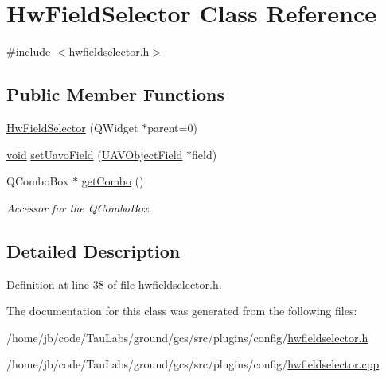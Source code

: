 \hypertarget{class_hw_field_selector}{\section{\-Hw\-Field\-Selector \-Class \-Reference}
\label{class_hw_field_selector}
}


{\ttfamily \#include $<$hwfieldselector.\-h$>$}

\subsection*{\-Public \-Member \-Functions}
\begin{DoxyCompactItemize}
\item 
\hyperlink{group___core_plugin_gaa29673aaa8535fe3be4f2a2d04bc5422}{\-Hw\-Field\-Selector} (\-Q\-Widget $\ast$parent=0)
\item 
\hyperlink{group___u_a_v_objects_plugin_ga444cf2ff3f0ecbe028adce838d373f5c}{void} \hyperlink{group___core_plugin_ga068f0e383aeba7a77ae5e4acfa3247b6}{set\-Uavo\-Field} (\hyperlink{class_u_a_v_object_field}{\-U\-A\-V\-Object\-Field} $\ast$field)
\item 
\-Q\-Combo\-Box $\ast$ \hyperlink{group___core_plugin_gac6b33d61ddc894413dd9766d721a40f3}{get\-Combo} ()
\begin{DoxyCompactList}\small\item\em \-Accessor for the \-Q\-Combo\-Box. \end{DoxyCompactList}\end{DoxyCompactItemize}


\subsection{\-Detailed \-Description}


\-Definition at line 38 of file hwfieldselector.\-h.



\-The documentation for this class was generated from the following files\-:\begin{DoxyCompactItemize}
\item 
/home/jb/code/\-Tau\-Labs/ground/gcs/src/plugins/config/\hyperlink{hwfieldselector_8h}{hwfieldselector.\-h}\item 
/home/jb/code/\-Tau\-Labs/ground/gcs/src/plugins/config/\hyperlink{hwfieldselector_8cpp}{hwfieldselector.\-cpp}\end{DoxyCompactItemize}

